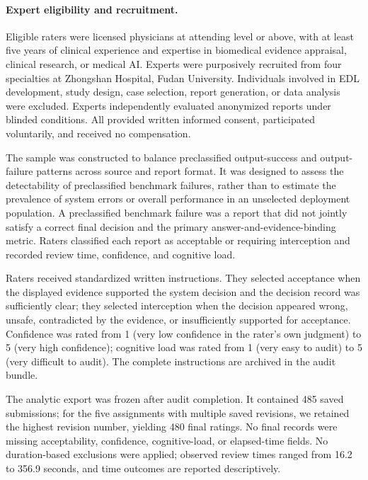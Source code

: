 \documentclass[11pt,a4paper]{article}
\begin{document}
\paragraph{Expert eligibility and recruitment.}
Eligible raters were licensed physicians at attending level or above, with at least five years of clinical experience and expertise in biomedical evidence appraisal, clinical research, or medical AI. Experts were purposively recruited from four specialties at Zhongshan Hospital, Fudan University. Individuals involved in EDL development, study design, case selection, report generation, or data analysis were excluded. Experts independently evaluated anonymized reports under blinded conditions. All provided written informed consent, participated voluntarily, and received no compensation.

The sample was constructed to balance preclassified output-success and output-failure patterns across source and report format. It was designed to assess the detectability of preclassified benchmark failures, rather than to estimate the prevalence of system errors or overall performance in an unselected deployment population. A preclassified benchmark failure was a report that did not jointly satisfy a correct final decision and the primary answer-and-evidence-binding metric. Raters classified each report as acceptable or requiring interception and recorded review time, confidence, and cognitive load.

Raters received standardized written instructions. They selected acceptance when the displayed evidence supported the system decision and the decision record was sufficiently clear; they selected interception when the decision appeared wrong, unsafe, contradicted by the evidence, or insufficiently supported for acceptance. Confidence was rated from 1 (very low confidence in the rater's own judgment) to 5 (very high confidence); cognitive load was rated from 1 (very easy to audit) to 5 (very difficult to audit). The complete instructions are archived in the audit bundle.

The analytic export was frozen after audit completion. It contained 485 saved submissions; for the five assignments with multiple saved revisions, we retained the highest revision number, yielding 480 final ratings. No final records were missing acceptability, confidence, cognitive-load, or elapsed-time fields. No duration-based exclusions were applied; observed review times ranged from 16.2 to 356.9 seconds, and time outcomes are reported descriptively.
\end{document}
